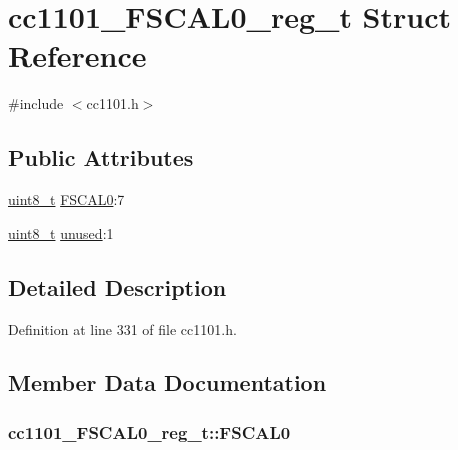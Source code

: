 \hypertarget{structcc1101___f_s_c_a_l0__reg__t}{}\section{cc1101\+\_\+\+F\+S\+C\+A\+L0\+\_\+reg\+\_\+t Struct Reference}
\label{structcc1101___f_s_c_a_l0__reg__t}


{\ttfamily \#include $<$cc1101.\+h$>$}

\subsection*{Public Attributes}
\begin{DoxyCompactItemize}
\item 
\hyperlink{_p_e___types_8h_aba7bc1797add20fe3efdf37ced1182c5}{uint8\+\_\+t} \hyperlink{structcc1101___f_s_c_a_l0__reg__t_a901c5a12250e59d1f72038636d5ec1cd}{F\+S\+C\+A\+L0}\+:7
\item 
\hyperlink{_p_e___types_8h_aba7bc1797add20fe3efdf37ced1182c5}{uint8\+\_\+t} \hyperlink{structcc1101___f_s_c_a_l0__reg__t_a094f014fed0e5f8436d228a226b6653a}{unused}\+:1
\end{DoxyCompactItemize}


\subsection{Detailed Description}


Definition at line 331 of file cc1101.\+h.



\subsection{Member Data Documentation}
\subsubsection[{\texorpdfstring{F\+S\+C\+A\+L0}{FSCAL0}}]{ cc1101\+\_\+\+F\+S\+C\+A\+L0\+\_\+reg\+\_\+t\+::\+F\+S\+C\+A\+L0}\hypertarget{structcc1101___f_s_c_a_l0__reg__t_a901c5a12250e59d1f72038636d5ec1cd}{}\label{structcc1101___f_s_c_a_l0__reg__t_a901c5a12250e59d1f72038636d5ec1cd}


